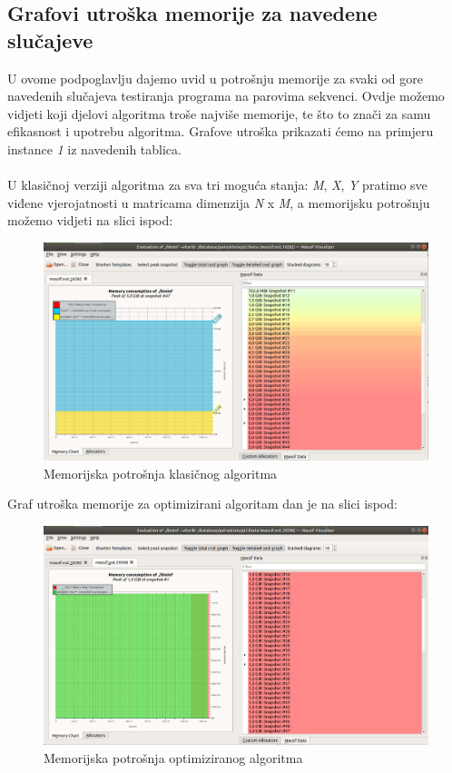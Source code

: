\documentclass[a4paper]{article}
\begin{document}
\subsection{Grafovi utroška memorije za navedene slučajeve}
U ovome podpoglavlju dajemo uvid u potrošnju memorije za svaki od gore navedenih slučajeva testiranja programa na parovima sekvenci. Ovdje možemo vidjeti koji djelovi algoritma troše najviše memorije, te što to znači za samu efikasnost i upotrebu algoritma. Grafove utroška prikazati ćemo na primjeru instance \textit{1} iz navedenih tablica.\\\\
U klasičnoj verziji algoritma za sva tri moguća stanja: \textit{M}, \textit{X}, \textit{Y} pratimo sve viđene vjerojatnosti u matricama dimenzija \textit{N} x \textit{M}, a memorijsku potrošnju možemo vidjeti na slici ispod:
\begin{figure}[H]
\centering
\includegraphics[width=\linewidth]{memory-consumption-classic.png}
\caption{Memorijska potrošnja klasičnog algoritma}
\end{figure}

Graf utroška memorije za optimizirani algoritam dan je na slici ispod:
\begin{figure}[H]
\centering
\includegraphics[width=\linewidth]{memory-consumption-optimized.png}
\caption{Memorijska potrošnja optimiziranog algoritma}
\end{figure}
\end{document}
